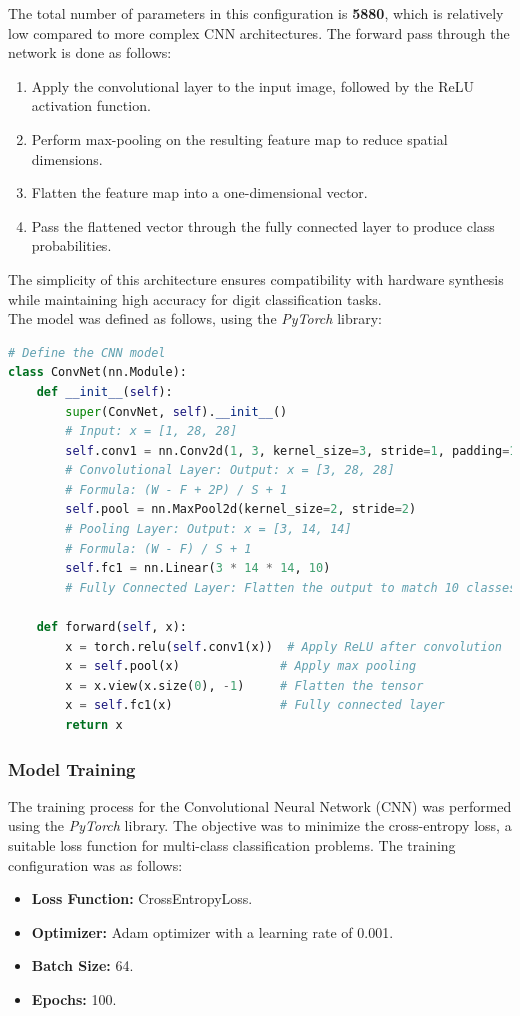 \documentclass{article}
\begin{document}
The total number of parameters in this configuration is \textbf{5880}, which is relatively low compared to more complex CNN architectures. The forward pass through the network is done as follows:
\begin{enumerate}
    \item Apply the convolutional layer to the input image, followed by the ReLU activation function.
    \item Perform max-pooling on the resulting feature map to reduce spatial dimensions.
    \item Flatten the feature map into a one-dimensional vector.
    \item Pass the flattened vector through the fully connected layer to produce class probabilities.
\end{enumerate}

The simplicity of this architecture ensures compatibility with hardware synthesis while maintaining high accuracy for digit classification tasks.\\

The model was defined as follows, using the \textit{PyTorch} library:

\begin{lstlisting}[language=Python]
# Define the CNN model
class ConvNet(nn.Module):
    def __init__(self):
        super(ConvNet, self).__init__()
        # Input: x = [1, 28, 28]
        self.conv1 = nn.Conv2d(1, 3, kernel_size=3, stride=1, padding=1)  
        # Convolutional Layer: Output: x = [3, 28, 28]
        # Formula: (W - F + 2P) / S + 1
        self.pool = nn.MaxPool2d(kernel_size=2, stride=2)  
        # Pooling Layer: Output: x = [3, 14, 14]
        # Formula: (W - F) / S + 1
        self.fc1 = nn.Linear(3 * 14 * 14, 10)  
        # Fully Connected Layer: Flatten the output to match 10 classes

    def forward(self, x):
        x = torch.relu(self.conv1(x))  # Apply ReLU after convolution
        x = self.pool(x)              # Apply max pooling
        x = x.view(x.size(0), -1)     # Flatten the tensor
        x = self.fc1(x)               # Fully connected layer
        return x
\end{lstlisting}


\subsubsection{Model Training}
The training process for the Convolutional Neural Network (CNN) was performed using the \textit{PyTorch} library. The objective was to minimize the cross-entropy loss, a suitable loss function for multi-class classification problems. The training configuration was as follows:
\begin{itemize}
    \item \textbf{Loss Function:} CrossEntropyLoss.
    \item \textbf{Optimizer:} Adam optimizer with a learning rate of 0.001.
    \item \textbf{Batch Size:} 64.
    \item \textbf{Epochs:} 100.
\end{itemize}
\end{document}
